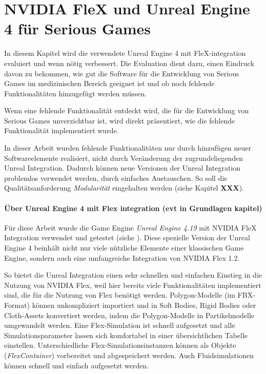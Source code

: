 
\chapter{NVIDIA FleX und Unreal Engine 4 für Serious Games}
\label{chap_Flex_Engine}

In diesem Kapitel wird die verwendete Unreal Engine 4 mit FleX-integration evaluiert und wenn nötig verbessert. Die Evaluation dient dazu, einen Eindruck davon zu bekommen, wie gut die Software für die Entwicklung von Serious Games im medizinischen Bereich geeignet ist und ob noch fehlende Funktionalitäten hinzugefügt werden müssen. 

Wenn eine fehlende Funktionalität entdeckt wird, die für die Entwicklung von Serious Games unverzichtbar ist, wird direkt präsentiert, wie die fehlende Funktionalität implementiert wurde.

In dieser Arbeit wurden fehlende Funktionalitäten nur durch hinzufügen neuer Softwareelemente realisiert, nicht durch Veränderung der zugrundeliegenden Unreal Integration. Dadurch können neue Versionen der Unreal Integration problemlos verwendet werden, durch einfaches Austauschen. So soll die Qualitätsanforderung \textit{Modularität} eingehalten werden (siehe Kapitel \textbf{XXX}).

\subsubsection{Über Unreal Engine 4 mit Flex integration (evt in Grundlagen kapitel)}

Für diese Arbeit wurde die Game Engine \textit{Unreal Engine 4.19} mit NVIDIA FleX Integration verwendet und getestet (siehe \cite{UE4FlexDoc}). Diese spezielle Version der Unreal Engine 4 beinhält nicht nur viele nützliche Elemente einer klassischen Game Engine, sondern auch eine umfangreiche Integration von NVIDIA Flex 1.2. 

So bietet die Unreal Integration einen sehr schnellen und einfachen Einstieg in die Nutzung von NVIDIA Flex, weil hier bereits viele Funktionalitäten implementiert sind, die für die Nutzung von Flex benötigt werden. Polygon-Modelle (im FBX-Format) können unkompliziert importiert und in Soft Bodies, Rigid Bodies oder Cloth-Assets konvertiert werden, indem die Polygon-Modelle in Partikelmodelle umgewandelt werden. Eine Flex-Simulation ist schnell aufgesetzt und alle Simulationsparameter lassen sich komfortabel in einer übersichtlichen Tabelle einstellen. Unterschiedliche Flex-Simulationsinstanzen können als Objekte (\textit{FlexContainer}) vorbereitet und abgespeichert werden. Auch Fluidsimulationen können schnell und einfach aufgesetzt werden.

